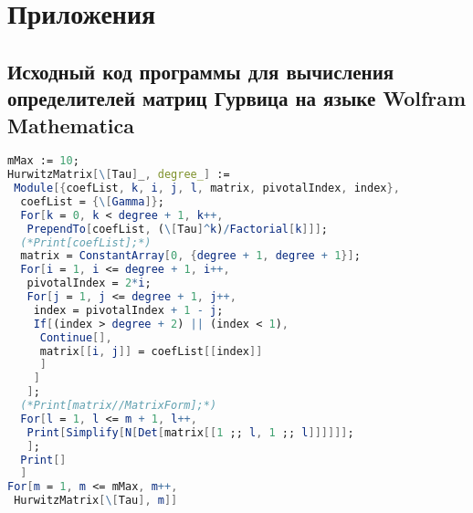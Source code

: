 \section{Приложения}

\subsection{Исходный код программы для вычисления определителей матриц Гурвица на языке Wolfram Mathematica}

\begin{lstlisting}[frame = single, language = Mathematica]
mMax := 10;
HurwitzMatrix[\[Tau]_, degree_] := 
 Module[{coefList, k, i, j, l, matrix, pivotalIndex, index},
  coefList = {\[Gamma]};
  For[k = 0, k < degree + 1, k++, 
   PrependTo[coefList, (\[Tau]^k)/Factorial[k]]];
  (*Print[coefList];*)
  matrix = ConstantArray[0, {degree + 1, degree + 1}];
  For[i = 1, i <= degree + 1, i++,
   pivotalIndex = 2*i;
   For[j = 1, j <= degree + 1, j++,
    index = pivotalIndex + 1 - j;
    If[(index > degree + 2) || (index < 1),
     Continue[],
     matrix[[i, j]] = coefList[[index]]
     ]
    ]
   ];
  (*Print[matrix//MatrixForm];*)
  For[l = 1, l <= m + 1, l++,
   Print[Simplify[N[Det[matrix[[1 ;; l, 1 ;; l]]]]]];
   ];
  Print[]
  ]
For[m = 1, m <= mMax, m++,
 HurwitzMatrix[\[Tau], m]]
\end{lstlisting}